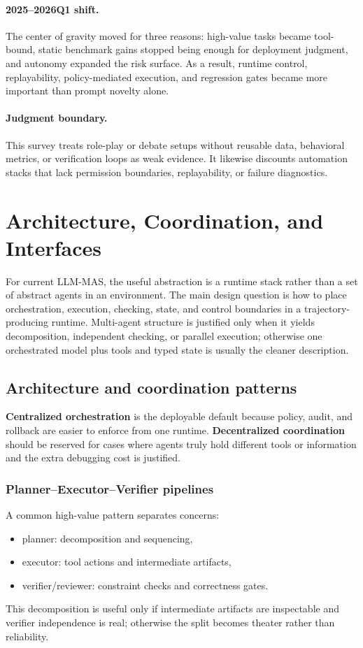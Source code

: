 \documentclass[11pt]{article}
\begin{document}
\paragraph{2025--2026Q1 shift.}
The center of gravity moved for three reasons: high-value tasks became tool-bound, static benchmark gains stopped being enough for deployment judgment, and autonomy expanded the risk surface. As a result, runtime control, replayability, policy-mediated execution, and regression gates became more important than prompt novelty alone.

\paragraph{Judgment boundary.}
This survey treats role-play or debate setups without reusable data, behavioral metrics, or verification loops as weak evidence. It likewise discounts automation stacks that lack permission boundaries, replayability, or failure diagnostics.

\section{Architecture, Coordination, and Interfaces}
For current LLM-MAS, the useful abstraction is a runtime stack rather than a set of abstract agents in an environment. The main design question is how to place orchestration, execution, checking, state, and control boundaries in a trajectory-producing runtime. Multi-agent structure is justified only when it yields decomposition, independent checking, or parallel execution; otherwise one orchestrated model plus tools and typed state is usually the cleaner description.

\subsection{Architecture and coordination patterns}
\textbf{Centralized orchestration} is the deployable default because policy, audit, and rollback are easier to enforce from one runtime. \textbf{Decentralized coordination} should be reserved for cases where agents truly hold different tools or information and the extra debugging cost is justified.

\subsubsection{Planner--Executor--Verifier pipelines}
A common high-value pattern separates concerns:
\begin{itemize}[leftmargin=1.2em]
  \item planner: decomposition and sequencing,
  \item executor: tool actions and intermediate artifacts,
  \item verifier/reviewer: constraint checks and correctness gates.
\end{itemize}
This decomposition is useful only if intermediate artifacts are inspectable and verifier independence is real; otherwise the split becomes theater rather than reliability.
\end{document}
